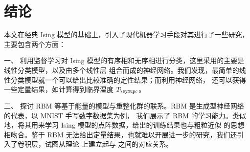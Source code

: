 \chapter{结论}

本文在经典 Ising 模型的基础上，引入了现代机器学习手段对其进行了一些研究，主要包含两个方面：

一、
利用监督学习对 Ising 模型的有序相和无序相进行分类，这里采用的主要是线性分类模型，以及由多个线性层
组合而成的神经网络。我们发现，最简单的线性分类模型就一个可以给出比较准确的定性结果；而利用神经网络，
还可以获得一些定量结果，如计算得到临界温度 $\Tc$。

二、
探讨 RBM 等基于能量的模型与重整化群的联系。RBM 是生成型神经网络的代表，以 MNIST 手写数字数据集为例，
我们展示了 RBM 的学习能力。类似地，将其用来学习 Ising 模型的点阵数据，给出的训练结果也与粗粒近似
的思想相吻合。鉴于 RBM 无法给出定量结果，也就难以开展进一步的研究，我们还引入了卷积层，试图从理论
上建立起与 \AdSCFT{} 之间的对应关系。
